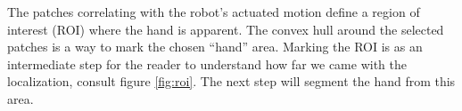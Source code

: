 %
The patches correlating with the robot's actuated motion define a region of interest (ROI) where the hand is apparent. The convex hull around the selected patches is a way to mark the chosen ``hand'' area. Marking the ROI is as an intermediate step for the reader to understand how far we came with the localization, consult figure \ref{fig:roi}. The next step will segment the hand from this area.
%
%
\\ \newline
%
%
%
%
